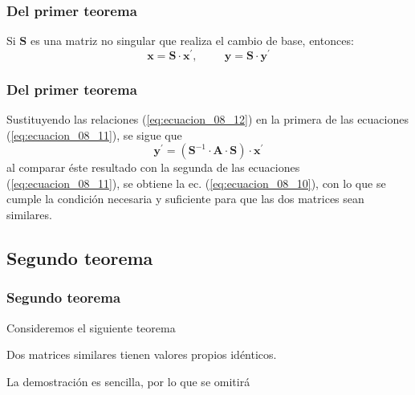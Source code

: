 \begin{frame}
\frametitle{Del primer teorema}
Si $\mathbf{S}$ es una matriz no singular que realiza el cambio de base, entonces:
\begin{equation}
\mathbf{x} = \mathbf{S} \cdot \mathbf{x^{\prime}}, \hspace{1cm} \mathbf{y} = \mathbf{S} \cdot \mathbf{y^{\prime}}
\label{eq:ecuacion_08_12}
\end{equation}
\end{frame}
\begin{frame}
\frametitle{Del primer teorema}
Sustituyendo las relaciones (\ref{eq:ecuacion_08_12}) en la primera de las ecuaciones (\ref{eq:ecuacion_08_11}), se sigue que
\[ \mathbf{y^{\prime}} =  (\mathbf{S}^{-1} \cdot \mathbf{A} \cdot \mathbf{S}) \cdot \mathbf{x}^{\prime} \]
al comparar éste resultado con la segunda de las ecuaciones (\ref{eq:ecuacion_08_11}), se obtiene la ec. (\ref{eq:ecuacion_08_10}), con lo que se cumple la condición necesaria y suficiente para que las dos matrices sean similares.
\end{frame}
\subsection*{Segundo teorema}
\begin{frame}
\frametitle{Segundo teorema}
Consideremos el siguiente teorema
\begin{teo}
Dos matrices similares tienen valores propios idénticos.
\end{teo}
La demostración es sencilla, por lo que se omitirá
\end{frame}
